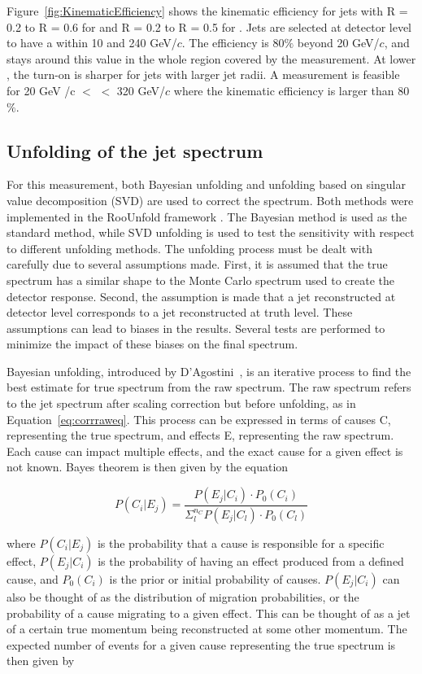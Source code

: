 Figure~\ref{fig:KinematicEfficiency} shows the kinematic efficiency for jets with R = 0.2 to R = 0.6 for \pp and R = 0.2 to R = 0.5 for \pPb. Jets are selected at detector level to have a \pT within 10 and 240 GeV/$c$. The efficiency is 80$\%$ beyond 20 GeV/$c$, and stays around this value in the whole region covered by the measurement. At lower \pT, the turn-on is sharper for jets with larger jet radii. A measurement is feasible for 20 GeV /c $<$ \pT $<$ 320 GeV/$c$ where the kinematic efficiency is larger than 80$\%$.

\subsection{Unfolding of the jet spectrum}
\label{sec:unfolding}

For this measurement, both Bayesian unfolding and unfolding based on singular value decomposition (SVD) are used to correct the spectrum. Both methods were implemented in the RooUnfold framework \cite{roounfold}. The Bayesian method is used as the standard method, while SVD unfolding is used to test the sensitivity with respect to different unfolding methods. The unfolding process must be dealt with carefully due to several assumptions made. First, it is assumed that the true spectrum has a similar shape to the Monte Carlo spectrum used to create the detector response. Second, the assumption is made that a jet reconstructed at detector level corresponds to a jet reconstructed at truth level. These assumptions can lead to biases in the results. Several tests are performed to minimize the impact of these biases on the final spectrum.

Bayesian unfolding, introduced by D'Agostini~\cite{D'Agostini:265717}, is an iterative process to find the best estimate for true spectrum from the raw spectrum. The raw spectrum refers to the jet spectrum after scaling correction but before unfolding, as in Equation~\ref{eq:corrraweq}. This process can be expressed in terms of causes C, representing the true spectrum, and effects E, representing the raw spectrum. Each cause can impact multiple effects, and the exact cause for a given effect is not known. Bayes theorem is then given by the equation

\begin{equation}
    P(C_i|E_j) = \frac{P(E_j|C_i)\cdot P_0(C_i)}{\Sigma_l^{n_C}P(E_j|C_l)\cdot P_0(C_l)}
\end{equation}

\noindent
where $P(C_i|E_j)$ is the probability that a cause is responsible for a specific effect, $P(E_j|C_i)$ is the probability of having an effect produced from a defined cause, and $P_0(C_i)$ is the prior or initial probability of causes. $P(E_j|C_i)$ can also be thought of as the distribution of migration probabilities, or the probability of a cause migrating to a given effect. This can be thought of as a jet of a certain true momentum being reconstructed at some other momentum. The expected number of events for a given cause representing the true spectrum is then given by

